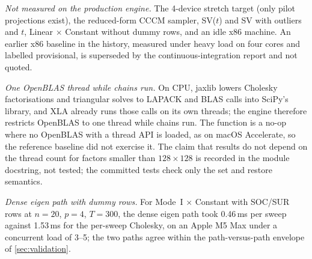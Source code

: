 \begin{table}[!htbp]
\centering\small
\caption{Kernel microbenchmarks at 80 lanes: packed and batched Gram, precision draw, SV
indicators, AWOL draw, exact correction, SV core and sweep; XLA flops and bytes accessed; and the
design budget lines.}
\label{tab:TabE3}

\end{table}

\emph{Not measured on the production engine.}
The 4-device stretch target (only pilot projections exist), the reduced-form CCCM sampler, SV($t$)
and SV with outliers and $t$, Linear $\times$ Constant without dummy rows, and an idle x86 machine.
An earlier x86 baseline in the history, measured under heavy load on four cores and labelled
provisional, is superseded by the continuous-integration report and not quoted.

\emph{One OpenBLAS thread while chains run.}
On CPU, jaxlib lowers Cholesky factorisations and triangular solves to LAPACK and BLAS calls into
SciPy's library, and XLA already runs those calls on its own threads; the engine therefore restricts
OpenBLAS to one thread while chains run.
The function is a no-op where no OpenBLAS with a thread API is loaded, as on macOS Accelerate, so the
reference baseline did not exercise it.
The claim that results do not depend on the thread count for factors smaller than $128\times128$ is
recorded in the module docstring, not tested; the committed tests check only the set and restore
semantics.

\emph{Dense eigen path with dummy rows.}
For Mode~I $\times$ Constant with SOC/SUR rows at $n = 20$, $p = 4$, $T = 300$, the dense eigen path
took 0.46\,ms per sweep against 1.53\,ms for the per-sweep Cholesky, on an Apple M5 Max under a
concurrent load of 3--5; the two paths agree within the path-versus-path envelope of
\cref{sec:validation}.

